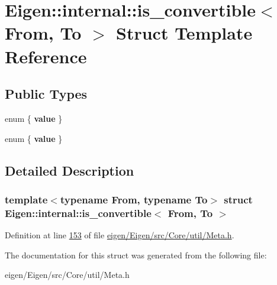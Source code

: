 \hypertarget{struct_eigen_1_1internal_1_1is__convertible}{}\section{Eigen\+:\+:internal\+:\+:is\+\_\+convertible$<$ From, To $>$ Struct Template Reference}
\label{struct_eigen_1_1internal_1_1is__convertible}
\subsection*{Public Types}
\begin{DoxyCompactItemize}
\item 
\mbox{\label{struct_eigen_1_1internal_1_1is__convertible_a70ae450d9b55e1b0b6644c7320ea49bc}} 
enum \{ {\bfseries value}
 \}
\item 
\mbox{\label{struct_eigen_1_1internal_1_1is__convertible_a88e954adcac3dfacac2ce011c9336210}} 
enum \{ {\bfseries value}
 \}
\end{DoxyCompactItemize}


\subsection{Detailed Description}
\subsubsection*{template$<$typename From, typename To$>$\newline
struct Eigen\+::internal\+::is\+\_\+convertible$<$ From, To $>$}



Definition at line \hyperlink{eigen_2_eigen_2src_2_core_2util_2_meta_8h_source_l00153}{153} of file \hyperlink{eigen_2_eigen_2src_2_core_2util_2_meta_8h_source}{eigen/\+Eigen/src/\+Core/util/\+Meta.\+h}.



The documentation for this struct was generated from the following file\+:\begin{DoxyCompactItemize}
\item 
eigen/\+Eigen/src/\+Core/util/\+Meta.\+h\end{DoxyCompactItemize}
